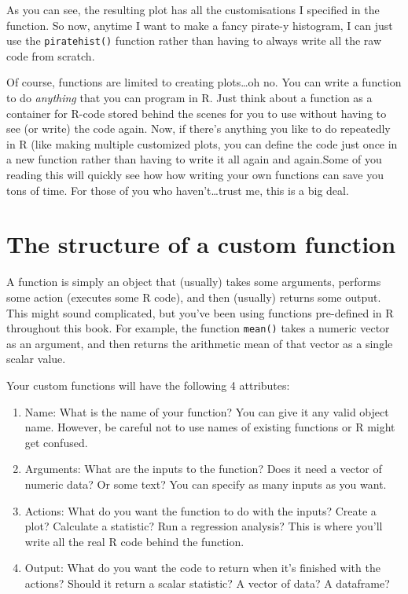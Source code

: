 \documentclass[]{book}
\theoremstyle{definition}
\theoremstyle{definition}
\theoremstyle{remark}
\begin{document}
As you can see, the resulting plot has all the customisations I
specified in the function. So now, anytime I want to make a fancy
pirate-y histogram, I can just use the \texttt{piratehist()} function
rather than having to always write all the raw code from scratch.

Of course, functions are limited to creating plots\ldots{}oh no. You can
write a function to do \emph{anything} that you can program in R. Just
think about a function as a container for R-code stored behind the
scenes for you to use without having to see (or write) the code again.
Now, if there's anything you like to do repeatedly in R (like making
multiple customized plots, you can define the code just once in a new
function rather than having to write it all again and again.Some of you
reading this will quickly see how how writing your own functions can
save you tons of time. For those of you who haven't\ldots{}trust me,
this is a big deal.

\section{The structure of a custom
function}\label{the-structure-of-a-custom-function}

A function is simply an object that (usually) takes some arguments,
performs some action (executes some R code), and then (usually) returns
some output. This might sound complicated, but you've been using
functions pre-defined in R throughout this book. For example, the
function \texttt{mean()} takes a numeric vector as an argument, and then
returns the arithmetic mean of that vector as a single scalar value.

Your custom functions will have the following 4 attributes:

\begin{enumerate}
\def\labelenumi{\arabic{enumi}.}
\item
  Name: What is the name of your function? You can give it any valid
  object name. However, be careful not to use names of existing
  functions or R might get confused.
\item
  Arguments: What are the inputs to the function? Does it need a vector
  of numeric data? Or some text? You can specify as many inputs as you
  want.
\item
  Actions: What do you want the function to do with the inputs? Create a
  plot? Calculate a statistic? Run a regression analysis? This is where
  you'll write all the real R code behind the function.
\item
  Output: What do you want the code to return when it's finished with
  the actions? Should it return a scalar statistic? A vector of data? A
  dataframe?
\end{enumerate}
\end{document}
